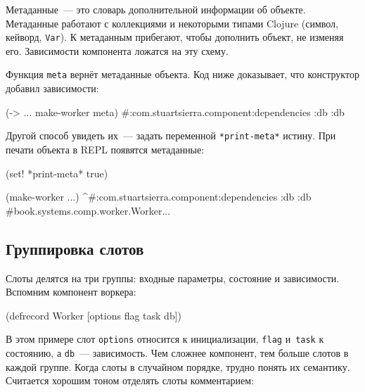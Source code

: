 Метаданные~--- это словарь дополнительной информации об объекте. Метаданные работают
с коллекциями и некоторыми типами Clojure (символ, кейворд, \verb|Var|). К
метаданным прибегают, чтобы дополнить объект, не изменяя его. Зависимости
компонента ложатся на эту схему.

Функция \verb|meta| вернёт метаданные объекта. Код ниже доказывает, что
конструктор добавил зависимости:

\begin{english}
  \begin{clojure}
(-> {...} make-worker meta)
#:com.stuartsierra.component{:dependencies {:db :db}}
  \end{clojure}
\end{english}

Другой способ увидеть их~--- задать переменной \verb|*print-meta*| истину. При
печати объекта в REPL появятся метаданные:


\begin{english}
  \begin{clojure}
(set! *print-meta* true)

(make-worker {...})
^#:com.stuartsierra.component{:dependencies {:db :db}}
#book.systems.comp.worker.Worker{...}
  \end{clojure}
\end{english}

\subsection{Группировка слотов}


Слоты делятся на три группы: входные параметры, состояние и
зависимости. Вспомним компонент воркера:

\begin{english}
  \begin{clojure}
(defrecord Worker
    [options flag task db])
  \end{clojure}
\end{english}

В этом примере слот \verb|options| относится к инициализации, \verb|flag|
и~\verb|task| к состоянию, а \verb|db|~--- зависимость. Чем сложнее компонент,
тем больше слотов в каждой группе. Когда слоты в случайном порядке, трудно понять
их семантику. Считается хорошим тоном отделять слоты комментарием:

